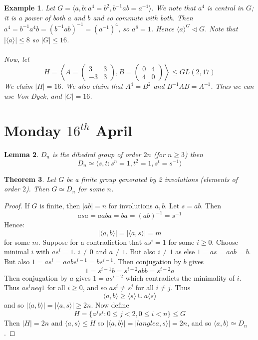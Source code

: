 \documentclass[a4paper,10pt]{article}
\newtheorem{thm}{Theorem}
\newtheorem{eg}[thm]{Example}
\newtheorem{Lem}[thm]{Lemma}
\begin{document}
\begin{eg}
Let $G = \langle a,b : a^4 = b^2, b^{-1} a b = a^{-1} \rangle$. We note that $a^4$ is central in $G$; it is a power of both $a$ and $b$ and so commute with both. Then $a^4 = b^{-1} a^4 b = (b^{-1} a b)^{-1} = (a^{-1})^4$, so $a^8 = 1$. Hence $\langle a \rangle^G \triangleleft G$. Note that $|\langle a \rangle| \leq 8$ so $|G| \leq 16$. \\
\\
Now, let 
\[ H = \left\langle A = \begin{pmatrix} 3 & 3 \\ -3 & 3 \end{pmatrix}, B = \begin{pmatrix} 0 & 4 \\ 4 & 0 \end{pmatrix} \right\rangle \leq GL(2,17) \]
We claim $|H| = 16$. We also claim that $A^4 = B^2$ and $B^{-1} A B = A^{-1}$. Thus we can use Von Dyck, and $|G| = 16$. 
\end{eg}


\newpage
\section{Monday $16^{th}$ April}

\begin{Lem}
$D_n$ is the dihedral group of order $2n$ (for $n \geq 3$) then
\[ D_n \simeq \langle s,t : s^n = 1, t^2 = 1, s^t = s^{-1} \rangle \]

\end{Lem}

\begin{thm}
Let $G$ be a finite group generated by 2 involutions (elements of order $2$). Then $G \simeq D_n$ for some $n$. 
\end{thm}

\begin{proof}
If $G$ is finite, then $|ab| = n$ for involutions $a,b$. Let $s = ab$. Then
\[ asa = aaba = ba = (ab)^{-1} = s^{-1} \]
Hence:
\[ |\langle a,b \rangle| = |\langle a,s \rangle| = m \] for some $m$. Suppose for a contradiction that $as^i = 1$ for some $i \geq 0$. Choose minimal $i$ with $as^i = 1$. $i \neq 0$ and $a \neq 1$. But also $i \neq 1$ as else $1 = as = aab = b$. But also $1 = as^i = aabs^{i-1} = bs^{i-1}$. Then conjugation by $b$ gives
\[ 1 = s^{i-1}b = s^{i-2} a bb = s^{i-2} a \]
Then conjugation by $a$ gives $1  = as^{i-2}$ which contradicts the minimality of $i$. Thus $as^i neq 1$ for all $i \geq 0$, and so $as^i \neq s^j$ for all $i \neq j$. Thus
\[ \langle a,b \rangle  \geq \langle s \rangle \cup a \langle s \rangle \]
and so $|\langle a,b \rangle | = |\langle a,s\rangle | \geq 2n$. Now define 
\[ H = \{ a^j s^i : 0 \leq j < 2, 0 \leq i < n \} \leq G \]
Then $|H| = 2n$ and $\langle a, s \rangle \leq H$ so $|\langle a,b \rangle| = |langle a,s\rangle| = 2n$, and so $\langle a,b \rangle \simeq D_n$. 
\end{proof}
\end{document}
